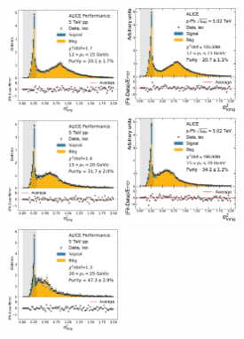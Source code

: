 \begin{figure}[hbtp]
\center
\includegraphics[width=0.3\textwidth]{Data_Analysis/Purity/tf-example-pp-cluster_Lambda-12-15.pdf}
\includegraphics[width=0.3\textwidth]{Data_Analysis/Purity/tf-example-p-Pb-cluster_Lambda-12-15.pdf}
\\
\includegraphics[width=0.3\textwidth]{Data_Analysis/Purity/tf-example-pp-cluster_Lambda-15-20.pdf}
\includegraphics[width=0.3\textwidth]{Data_Analysis/Purity/tf-example-p-Pb-cluster_Lambda-15-20.pdf}
\\
\includegraphics[width=0.3\textwidth]{Data_Analysis/Purity/tf-example-pp-cluster_Lambda-20-25.pdf}

\end{figure}
